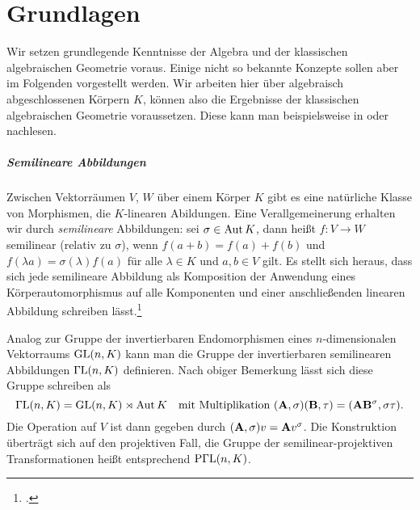 \chapter{Grundlagen} \label{chap:prelim}
Wir setzen grundlegende Kenntnisse der Algebra und der klassischen algebraischen Geometrie voraus. Einige nicht so bekannte Konzepte sollen aber im Folgenden vorgestellt werden. Wir arbeiten hier über algebraisch abgeschlossenen Körpern $K$, können also die Ergebnisse der klassischen algebraischen Geometrie voraussetzen. Diese kann man beispielsweise in \cite{Shafarevich} oder \cite{Mumford} nachlesen.

\paragraph{Semilineare Abbildungen} Zwischen Vektorräumen $V$, $W$ über einem Körper $K$ gibt es eine natürliche Klasse von Morphismen, die $K$-linearen Abildungen. Eine Verallgemeinerung erhalten wir durch \emph{semilineare} Abbildungen: sei $\sigma \in \operatorname{Aut} K$, dann heißt $f: V \to W$ semilinear (relativ zu $\sigma$), wenn $f(a+b) = f(a) + f(b)$ und $f(\lambda a) = \sigma(\lambda)f(a)$ für alle $\lambda \in K$ und $a, b \in V$ gilt. Es stellt sich heraus, dass sich jede semilineare Abbildung als Komposition der Anwendung eines Körperautomorphismus auf alle Komponenten und einer anschließenden linearen Abbildung schreiben lässt.\footcite[Das folgt leicht aus den Bemerkungen in][S.~2--3]{Dieudonne}

Analog zur Gruppe der invertierbaren Endomorphismen eines $n$-dimensionalen Vektorraums $\mathrm{GL}(n,K)$ kann man die Gruppe der invertierbaren semilinearen Abbildungen $\mathrm{\Gamma L}(n,K)$ definieren. Nach obiger Bemerkung lässt sich diese Gruppe schreiben als
\begin{equation}
\mathrm{\Gamma L}(n,K) = \mathrm{GL}(n,K) \rtimes \operatorname{Aut} K \quad\text{mit Multiplikation } (\mathbf{A}, \sigma)(\mathbf{B}, \tau) = (\mathbf{A} \mathbf{B}^\sigma, \sigma \tau).
\end{equation}
Die Operation auf $V$ ist dann gegeben durch $(\mathbf{A}, \sigma)v = \mathbf{A} v^\sigma$. Die Konstruktion überträgt sich auf den projektiven Fall, die Gruppe der semilinear-projektiven Transformationen heißt entsprechend $\mathrm{P\Gamma L}(n,K)$.

